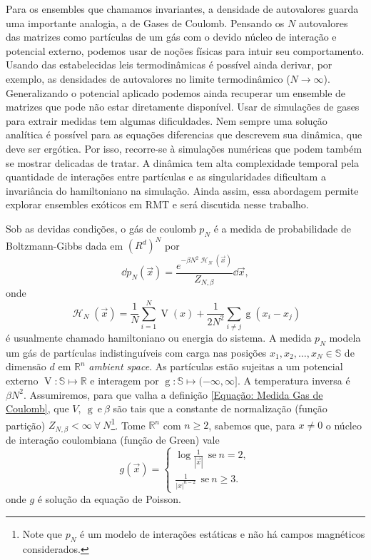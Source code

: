 \documentclass[11pt,twocolumn]{article}
\newcommand{\mmany}[2]{ #1_1, #1_2, \dots, #1_#2 }
\DeclareMathOperator{\Hf}{\mathcal{H}}
\DeclareMathOperator{\g}{g}
\DeclareMathOperator{\V}{V}
\newcommand{\R}{\mathbb{R}}
\newcommand{\p}{p} %
\newcommand{\Se}{\mathbb{S}}
\numberwithin{equation}{section} %
\begin{document}
Para os ensembles que chamamos invariantes, a densidade de autovalores guarda uma importante analogia, a de Gases de Coulomb. Pensando os $N$ autovalores das matrizes como partículas de um gás com o devido núcleo de interação e potencial externo, podemos usar de noções físicas para intuir seu comportamento. Usando das estabelecidas leis termodinâmicas é possível ainda derivar, por exemplo, as densidades de autovalores no limite termodinâmico ($N \rightarrow \infty$). Generalizando o potencial aplicado podemos ainda recuperar um ensemble de matrizes que pode não estar diretamente disponível. Usar de simulações de gases para extrair medidas tem algumas dificuldades. Nem sempre uma solução analítica é possível para as equações diferencias que descrevem sua dinâmica, que deve ser ergótica. Por isso, recorre-se à simulações numéricas que podem também se mostrar delicadas de tratar. A dinâmica tem alta complexidade temporal pela quantidade de interações entre partículas e as singularidades dificultam a invariância do hamiltoniano na simulação. Ainda assim, essa abordagem permite explorar ensembles exóticos em RMT e será discutida nesse trabalho.


Sob as devidas condições, o gás de coulomb $\p_N$ \cite{ChafaCoulombMeasure} é a medida de probabilidade de Boltzmann-Gibbs dada em $(R^d)^N$ por 
\begin{equation}
	\dd \p_N(\vec{x}) = \frac{e^{-\beta N^2 \Hf_N(\vec{x})}}{Z_{N,\beta}} \dd \vec{x},
	\label{Equação: Medida Gas de Coulomb}
\end{equation}
onde $$\Hf_N(\vec{x}) = \frac{1}{N} \sum_{i = 1}^{N} \V(x) + \frac{1}{2N^2} \sum_{i \neq j} \g(x_i - x_j)$$ é usualmente chamado hamiltoniano ou energia do sistema. A medida $\p_N$ modela um gás de partículas indistinguíveis com carga nas posições $\mmany{x}{N} \in \Se$ de dimensão $d$ em $\R^n$ \textit{ambient space}. As partículas estão sujeitas a um potencial externo $\V \colon \Se \mapsto \R$ e interagem por $\g \colon \Se \mapsto (-\infty, \infty]$. A temperatura inversa é $\beta N^2$. Assumiremos, para que valha a definição \ref{Equação: Medida Gas de Coulomb}, que $V, \ \g \ \text{e} \ \beta$ são tais que a constante de normalização (função partição) $Z_{N, \beta} < \infty \ \forall \ N$\footnote{Note que $\p_N$ é um modelo de interações estáticas e não há campos magnéticos considerados.}. Tome $\R^n$ com $n \geq 2$, sabemos que, para $x \neq 0$ o núcleo de interação coulombiana (função de Green) vale $$
g(\vec{x}) =
\begin{cases}
	\log \frac{1}{|\vec{x}|} \ \ \text{se} \ n = 2,\\
	\frac{1}{|x|^{n-2}} \ \ \text{se} \ n \geq 3.
\end{cases}
$$ onde $g$ é solução da equação de Poisson.
\end{document}
